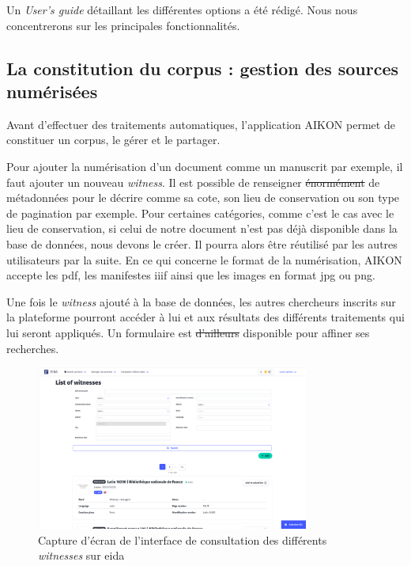 Un \textit{User's guide} détaillant les différentes options a été rédigé.  Nous nous concentrerons sur les principales fonctionnalités.




\subsection{La constitution du corpus : gestion des sources numérisées}

Avant d'effectuer des traitements automatiques, l'application AIKON permet de constituer un corpus, le gérer et le partager. 

Pour ajouter la numérisation d'un document comme un manuscrit par exemple, il faut ajouter un nouveau \textit{witness}. Il est possible de renseigner \st{énormément} de métadonnées pour le décrire comme sa cote, son lieu de conservation ou son type de pagination par exemple. Pour certaines catégories, comme c'est le cas avec le lieu de conservation, si celui de notre document n'est pas déjà disponible dans la base de données, nous devons le créer. Il pourra alors être réutilisé par les autres utilisateurs par la suite. En ce qui concerne le format de la numérisation, AIKON accepte les pdf, les manifestes \gls{iiif} ainsi que les images en format jpg ou png. 

Une fois le \textit{witness} ajouté à la base de données, les autres chercheurs inscrits sur la plateforme pourront accéder à lui et aux résultats des différents traitements qui lui seront appliqués. Un formulaire est \st{d'ailleurs} disponible pour affiner ses recherches.

\begin{figure}[H]
	\centering
	\includegraphics[width=0.8\textwidth]{images/list_witnesses.png}
	\caption{Capture d'écran de l'interface de consultation des différents \textit{witnesses} sur \gls{eida}}
	\label{fig:apercu_witnesses}
\end{figure}

